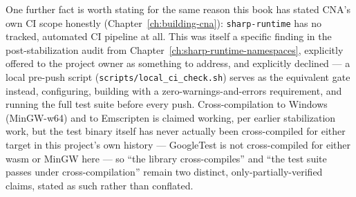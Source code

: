One further fact is worth stating for the same reason this book has stated CNA's own CI scope
honestly (Chapter~\ref{ch:building-cna}): \texttt{sharp-runtime} has no tracked,
automated CI pipeline at all. This was itself a specific finding in the post-stabilization
audit from Chapter~\ref{ch:sharp-runtime-namespaces}, explicitly offered to the project owner
as something to address, and explicitly declined --- a local pre-push script
(\texttt{scripts/local\_ci\_check.sh}) serves as the equivalent gate instead, configuring,
building with a zero-warnings-and-errors requirement, and running the full test suite before
every push. Cross-compilation to Windows (MinGW-w64) and to Emscripten is claimed working, per
earlier stabilization work, but the test binary itself has never actually been cross-compiled
for either target in this project's own history --- GoogleTest is not cross-compiled for
either wasm or MinGW here --- so ``the library cross-compiles'' and ``the test suite passes
under cross-compilation'' remain two distinct, only-partially-verified claims, stated as such
rather than conflated.
